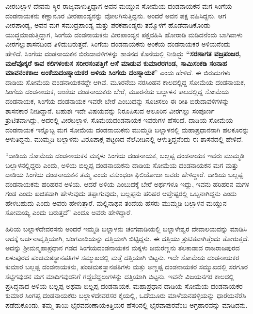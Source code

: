 ವೀರಬಲ್ಲಾಳ ದೇವನು ಸ್ಥಿರ ರಾಜ್ಯವಾಳುತ್ತಿದ್ದಾಗ ಅವನ ಮಯ್ದುನ ಸೋಮೆಯ ದಂಡನಾಯಕನ ಮಗ ಸಿಂಗೆಯ ದಂಡನಾಯಕನು ಕಣ್ಣಾನೂರ ವೀರಪಾಂಡ್ಯನನ್ನು ವೋಲಗಿಸುತ್ತಿದ್ದನು. ಅಂದರೆ ಅವನ ಪಕ್ಷ ವಹಿಸಿದ್ದನು. ಆಗ ವೀರಪಾಂಡ್ಯ, ಅವನ ಮಗ ಸಮುದ್ರಪಾಂಡ್ಯ ಮತ್ತು ಪರಕಪಾಂಡ್ಯರು ತಮ್ಮೊಳಗೆ ಹೊಡೆದಾಡಿಕೊಂಡು ಯುದ್ಧಮಾಡುತ್ತಿದ್ದಾಗ, ಸಿಂಗೆಯ ದಂಡನಾಯಕನು ವೀರಪಾಂಡ್ಯನ ಪಕ್ಷವಹಿಸಿ ಹೋರಾಡಿ ಮಡಿದನೆಂದು ಬಾಗಿವಾಳು ವೀರಗಲ್ಲುಶಾಸನದಿಂದ ತಿಳಿದುಬರುತ್ತದೆ. ಸಿಂಗೆಯ ದಂಡನಾಯಕನು ಅಂಕೆಯ ದಂಡನಾಯಕರ ಅಳಿಯನೆಂದು ಹೇಳಿದೆ. ಸಿಂಗೆಯ ದಂಡನಾಯಕನ ಬಿರುದಾವಳಿಗಳನ್ನು ಶಾಸನದ ಕೊನೆಯಲ್ಲಿ ನೀಡಿದ್ದು \textbf{“ಸರಣಾಗತ ವಜ್ರಪಂಜರ, ಮಱೆವೊಕ್ಕರೆ ಕಾವ ಕಲಿಗಳಂಕುಸ ಸರೀರಸಂಪತ್ತಿಗೆ ಆಸೆ ಮಾಡುವ ಕುಮಾರರಗಂಡ, ಸಾಮಿಸಂಕಡಿ ಸಂನಾಹ ಮಾವನಂಕಕಾಱ ಅಂಕೆಯದಂಣ್ನಾಯಕರ ಅಳಿಯ ಸಿಂಗೆಯ ದಂಣ್ನಾಯಕ}” ಎಂದು ಹೇಳಿದೆ. ಈ ಬಿರುದುಗಳು ದಾಡಿಯ ಸೋಮೆಯ ದಂಡನಾಯಕನದ್ದೇ ಆಗಿವೆ. ಮೂರನೆಯ ನರಸಿಂಹನ ಕಾಲದಲ್ಲಿದ್ದ ಸೋಮೆಯ ದಂಡನಾಯಕ, ಸಿಂಗೆಯ ದಂಡನಾಯಕ, ಅಂಕೆಯ ದಂಡನಾಯಕರು ಬೇರೆ, ಮೂರನೆಯ ಬಲ್ಲಾಳನ ಕಾಲದಲ್ಲಿದ್ದ ಸೋಮೆಯ ದಂಡನಾಯಕ, ಸಿಂಗೆಯ ದಂಡನಾಯಕ ಇವರೇ ಬೇರೆ ಎಂಬುದನ್ನು ಸೂಚಿಸಲು ಈ ರೀತಿ ಬಿರುದಾವಳಿಗಳನ್ನು ಶಾಸನಕಾರ ನೀಡಿದ್ದಾನೆ. ಬಹುಶಃ ಇದೇ ವಿಷಯವನ್ನು ನಿರೂಪಿಸುವ ಆಲೂರಿನ ವೀರಗಲ್ಲು ಸಂಪೂರ್ಣ ತ್ರುಟಿತವಾಗಿದ್ದು, ಅದರಲ್ಲಿ ವೀರಬಲ್ಲಾಳ, ಸೊಮೆಯದಂಡನಾಯಕ ಇವರುಗಳ ಹೆಸರಿದೆ. ದಾಡಿಯ ಸೋಮೆಯ ದಂಡನಾಯಕ ಇನ್ನೊಬ್ಬ ಮಗ ಸೋಮೆಯ ದಂಡನಾಯಕನು ಮುಮ್ಮಡಿ ಬಲ್ಲಾಳನಲ್ಲಿ ಮಹಾಪ್ರಧಾನನಾಗಿ ಹಲಕೂರನ್ನು ಆಳುತಿದ್ದನು. ಮುಮ್ಮಡಿ ಬಲ್ಲಾಳನು ವಿರೂಪಾಕ್ಷ ಪಟ್ಟಣದ ನೆಲೆವೀಡಿನಲ್ಲಿ ಆಳುತ್ತಿದ್ದನೆಂದು ಈ ಶಾಸನದಲ್ಲಿ ಹೇಳಿದೆ.

“ದಾಡಿಯ ಸೋಮೆಯ ದಂಡನಾಯಕನ ಮಕ್ಕಳು ಸಿಂಗೆಯ ದಂಡನಾಯಕ, ಬಲ್ಲಪ್ಪ ದಂಡನಾಯಕ ಇವರು ಮುಮ್ಮಡಿ ಬಲ್ಲಾಳನಲ್ಲಿದ್ದರು ಎಂದು, ಅಳಿಯ ಬಿಲ್ಲಪ್ಪ ದಂಡನಾಯಕನು ದಾಡಿಯ ಸೋಮೆಯ ದಂಡನಾಯಕನ ಮಗ ಮತ್ತು ದಾಡಿಯ ಸಿಂಗೆಯ ದಂಡನಾಯಕನ ತಮ್ಮ ಎಂದು ವಸುಂಧರಾ ಫಿಲಿಯೋಜಾ ಅವರು ಹೇಳಿದ್ದಾರೆ. ದಾಡಿಯ ಬಲ್ಲಪ್ಪ ದಂಡನಾಯಕನು ಹರಿಹರನ ಅಳಿಯ. ಆದರೆ ಅಳಿಯ ಎಂಬುದಕ್ಕೆ ಬೇರೆ ಅರ್ಥಗಳೂ ಇದ್ದು, ಇವನು ಹರಿಹರನ ಮಗಳ ಗಂಡ ಎಂದು ಖಚಿತವಾಗಿ ಹೇಳುವುದು ತಪ್ಪಾಗುವುದು, ಬಲ್ಲಪ್ಪನು ಹರಿಹರ ಆಪ್ತೇಷ್ಟರಲ್ಲಿ ಒಬ್ಬನಾಗಿದ್ದನು ಎಂದು ಹೇಳಬಹುದು ಎಂದು ಅವರು ಹೇಳುತ್ತಾರೆ. ಮಲ್ಲಿನಾಥನ ತಂದೆಯ ಹೆಸರು ಮುಮ್ಮಡಿ ಬಲ್ಲಾಳನ ಮಯ್ದುನ ಸೋಮಯ್ಯ ಎಂದು ಬರುತ್ತದೆ” ಎಂದೂ ಅವರು ಹೇಳಿದ್ದಾರೆ.

ಹಿರಿಯ ಬಲ್ಲಾಳದೇವರಸನು ಅಂದರೆ ಇಮ್ಮಡಿ ಬಲ್ಲಾಳನು ಚಂಗವಾಡಿಯಲ್ಲಿ ಬಲ್ಲಾಳೇಶ್ವರ ದೇವಾಲಯವನ್ನು ಮಾಡಿಸಿ ಅದಕ್ಕೆ ಅರ್ಚನಾವೃತ್ತಿಯಾಗಿ, ಚಂಗವಾಡಿಯನ್ನು ದತ್ತಿಯಾಗಿ ಬಿಟ್ಟಿದ್ದನು. ಈ ದತ್ತಿಯು ತ್ರುಟಿತವಾಗಿತ್ತೆಂದು ತೋರುತ್ತದೆ. ಅದನ್ನು ಶ‍್ರೀಮನ್ಮಹಾಪ್ರಧಾನ ಗಡದ ಸಿಂಗೆಯದಂಡನಾಯಕನ ಮಕ್ಕಳು ಜಮರಣ್ಣನು ತಲಕಾಡಾದ ರಾಜರಾಜಪುರದ ಏಳುಪುರದ ಪಂಚಮಠಸ್ಥಾನಪತಿಗಳ ಸಮ್ಮುಖದಲ್ಲಿ ಮತ್ತೆ ದತ್ತಿಯಾಗಿ ಬಿಟ್ಟನು. ಇದೇ ಸೋಮೆಯ ದಂಡನಾಯಕರ ಕುಮಾರ ಬಲ್ಲಪ್ಪ ದಂಡನಾಯಕನು, ಪಂಚಮಠಸ್ಥಾನಪತಿಗಳು ಮತ್ತು ಅಣ್ಣಪ್ಪ ದಂಡನಾಯಕರ ಸಮ್ಮುಖದಲ್ಲಿ ಸರಗೂರ ಸೆಟ್ಟಿಗವುಡನ ಮಗ ಮಾದಿಗವುಡನಿಗೆ ಗದ್ದೆಬೆದ್ದಲುಗಳನ್ನು ದತ್ತಿಯಾಗಿ ಬಿಟ್ಟನು. ಇವನೇ ವಿಜಯನಗರ ಕಾಲದಲ್ಲಿ ಪ್ರಸಿದ್ಧನಾದ ಅಳಿಯ ಬಲ್ಲಪ್ಪ ಅಥವಾ ಬಿಲ್ಲಪ್ಪ ದಂಡನಾಯಕ. ಮಹಾಪ್ರಧಾನ ದಾಡಿಯ ಸೋಮೆಯ ದಂಡನಾಯಕರ ಕುಮಾರ ಸಿಂಗಪ್ಪ ದಂಡನಾಯಕರು ಬಲ್ಲಾಳದೇವರಸರ ಕೈಯಲ್ಲಿ, ಒದೆಯೂರು ಮಾಳೆಯನಹಳ್ಳಿಯನ್ನು ಧಾರೆಯನೆರೆಸಿ ಪಡೆದುಕೊಂಡು, ತಮ್ಮ ತಾಯಿ ಭೈರವದಂಣಾಯಕಿತ್ತಿಯರ ಹೆಸರಿನಲ್ಲಿ ಭೈರವಾಪುರವೆಂಬ ಅಗ್ರಹಾರವನ್ನು ಮಾಡಿದನು.

